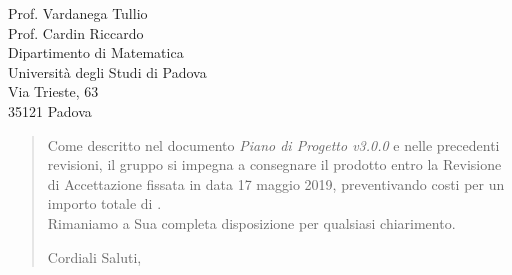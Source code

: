 \begin{letter}{
		Prof. Vardanega Tullio \\
		Prof. Cardin Riccardo \\
		Dipartimento di Matematica \\
		Università degli Studi di Padova \\
		Via Trieste, 63 \\
		35121 Padova}
\begin{quotation}
\noindent Come descritto nel documento \textit{Piano di Progetto v3.0.0} e 
nelle precedenti revisioni, il gruppo si impegna a consegnare il prodotto entro 
la Revisione di Accettazione fissata in data 17 maggio 2019, preventivando 
costi per un importo totale di \textbf{}.\\
Rimaniamo a Sua completa disposizione per qualsiasi chiarimento.

\vspace{0.5cm}
\noindent Cordiali Saluti,
\closing{}	

\end{quotation}
		
\end{letter}

